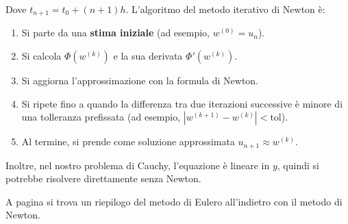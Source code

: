 \begin{enumerate}
\begin{enumerate}
\begin{equation*}
        \end{equation*}
        Dove $t_{n+1} = t_0 + (n+1) h$.
        L'algoritmo del metodo iterativo di Newton è:
        \begin{enumerate}
            \item Si parte da una \textbf{stima iniziale} (ad esempio, $w^{(0)} = u_n$).
            \item Si calcola $\Phi(w^{(k)})$ e la sua derivata $\Phi'(w^{(k)})$.
            \item Si aggiorna l'approssimazione con la formula di Newton.
            \item Si ripete fino a quando la differenza tra due iterazioni successive è minore di una tolleranza prefissata (ad esempio, $|w^{(k+1)} - w^{(k)}| < \text{tol}$).
            \item Al termine, si prende come soluzione approssimata $u_{n+1} \approx w^{(k)}$.
        \end{enumerate}
        Inoltre, nel nostro problema di Cauchy, l'equazione è lineare in $y$, quindi si potrebbe risolvere direttamente senza Newton.
    \end{enumerate}
    A pagina  si trova un riepilogo del metodo di Eulero all'indietro con il metodo di Newton.
\end{enumerate}